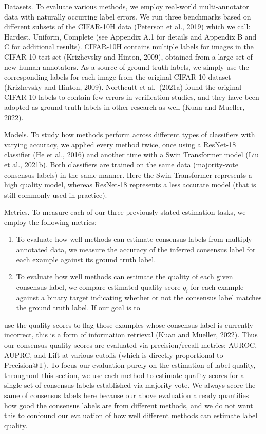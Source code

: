 \documentclass[
]{article}
\providecommand{\tightlist}{%
  \setlength{\itemsep}{0pt}\setlength{\parskip}{0pt}}
\begin{document}
Datasets. To evaluate various methods, we employ real-world
multi-annotator data with naturally occurring label errors. We run three
benchmarks based on different subsets of the CIFAR-10H data (Peterson et
al., 2019) which we call: Hardest, Uniform, Complete (see Appendix A.1
for details and Appendix B and C for additional results). CIFAR-10H
contains multiple labels for images in the CIFAR-10 test set (Krizhevsky
and Hinton, 2009), obtained from a large set of new human annotators. As
a source of ground truth labels, we simply use the corresponding labels
for each image from the original CIFAR-10 dataset (Krizhevsky and
Hinton, 2009). Northcutt et al.~(2021a) found the original CIFAR-10
labels to contain few errors in verification studies, and they have been
adopted as ground truth labels in other research as well (Kuan and
Mueller, 2022).

Models. To study how methods perform across different types of
classifiers with varying accuracy, we applied every method twice, once
using a ResNet-18 classifier (He et al., 2016) and another time with a
Swin Transformer model (Liu et al., 2021b). Both classifiers are trained
on the same data (majority-vote consensus labels) in the same manner.
Here the Swin Transformer represents a high quality model, whereas
ResNet-18 represents a less accurate model (that is still commonly used
in practice).

Metrics. To measure each of our three previously stated estimation
tasks, we employ the following metrics:

\begin{enumerate}
\def\labelenumi{\arabic{enumi}.}
\tightlist
\item
  To evaluate how well methods can estimate consensus labels from
  multiply-annotated data, we measure the accuracy of the inferred
  consensus label for each example against its ground truth label.\\
\item
  To evaluate how well methods can estimate the quality of each given
  consensus label, we compare estimated quality score \(q_{i}\) for each
  example against a binary target indicating whether or not the
  consensus label matches the ground truth label. If our goal is to
\end{enumerate}

use the quality scores to flag those examples whose consensus label is
currently incorrect, this is a form of information retrieval (Kuan and
Mueller, 2022). Thus our consensus quality scores are evaluated via
precision/recall metrics: AUROC, AUPRC, and Lift at various cutoffs
(which is directly proportional to Precision@T). To focus our evaluation
purely on the estimation of label quality, throughout this section, we
use each method to estimate quality scores for a single set of consensus
labels established via majority vote. We always score the same of
consensus labels here because our above evaluation already quantifies
how good the consensus labels are from different methods, and we do not
want this to confound our evaluation of how well different methods can
estimate label quality.
\end{document}
